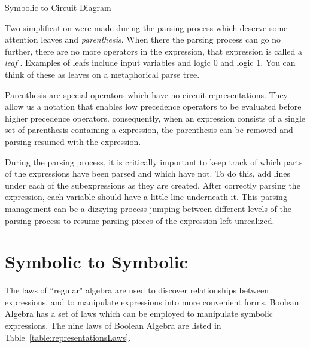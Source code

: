 \begin{process}{Symbolic to Circuit Diagram}
{\setlength{\fboxsep}{0pt}
\centering
{}
\par}\vspace{0.2cm}
\end{process}

Two simplification were made during the parsing process which deserve some attention
leaves and \textit{parenthesis}.  When there the parsing process can go no
further, there are no more operators in the expression, that expression is called a \textit{leaf} .
Examples of leafs include input variables and logic 0 and logic 1.  You can think of these as leaves on a
metaphorical parse tree.

Parenthesis are special operators which have no circuit representations.  They allow us a notation that
enables low precedence operators to be evaluated before higher precedence operators.
consequently, when an expression consists of a single set of parenthesis containing a
expression, the parenthesis can be removed and parsing resumed with the expression.

During the parsing process, it is critically important to keep track of which
parts of the expressions have been parsed and which have not.  To
do this, add lines under each of the subexpressions as they are created.
After correctly parsing the expression, each variable should have a little
line underneath it.  This parsing-management can be a dizzying process
jumping between different levels of the parsing process to resume
parsing pieces of the expression left unrealized.

\section{Symbolic to Symbolic}
The laws of ``regular" algebra are used to discover relationships
between expressions, and to manipulate expressions into more convenient forms.
Boolean Algebra has a set of laws which can be employed to manipulate
symbolic expressions.  The nine laws of Boolean Algebra are listed in
Table~\ref{table:representationsLaws}.

